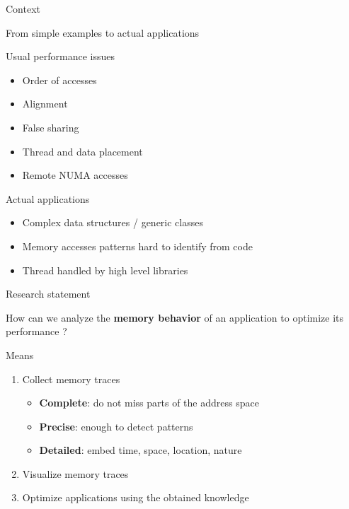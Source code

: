 \documentclass[xcolor={usenames,dvipsnames},hyperref={pdfusetitle}]{beamer}
\begin{document}
\begin{section}{Context}
\begin{frame}{From simple examples to actual applications}
    \begin{block}{Usual performance issues}
        \begin{itemize}
            \item Order of accesses
            \item Alignment
            \item False sharing
            \item Thread and data placement
            \item Remote NUMA accesses
        \end{itemize}
    \end{block}
    \pause
    \begin{alertblock}{Actual applications}
        \begin{itemize}
            \item Complex data structures / generic classes
            \item Memory accesses patterns hard to identify from code
            \item Thread handled by high level libraries
        \end{itemize}
    \end{alertblock}
\end{frame}

\begin{frame}{Research statement}
    \begin{exampleblock}{}
        How can we analyze the \textbf{memory behavior} of an application to optimize its performance ?
    \end{exampleblock}
    \pause
    \begin{exampleblock}{Means}
        \begin{enumerate}
                \item Collect memory traces
                \begin{itemize}
                    \item \textbf{Complete}: do not miss parts of the address space
                    \item \textbf{Precise}:  enough to detect patterns
                    \item \textbf{Detailed}: embed time, space, location, nature
                \end{itemize}
                \item Visualize memory traces
                \item Optimize applications using the obtained knowledge
        \end{enumerate}
    \end{exampleblock}
\end{frame}

\end{section}
\end{document}
